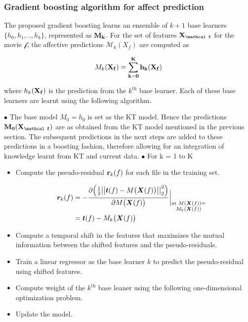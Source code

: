 \documentclass{article}
\begin{document}
\subsubsection{Gradient boosting algorithm for affect prediction}
The proposed gradient boosting learns an ensemble of $k+1$ base learners $\{h_0, h_1, .., h_k\}$, represented as $\bf M_k$. 
For the set of features $\bf X_{\mathcal f}$ for the movie $\mathcal f$, the affective predictions $\mathcal M_k(X_f)$ are computed as  

\begin{equation}
\mathcal \bf M_k(\bf X_f) = \sum_{k=0}^K h_k(\bf X_f)
\end{equation}

where $h_k(\bf X_f)$ is the prediction from the $k^\text{th}$ base learner.
Each of these base learners are learnt using the following algorithm.

$\bullet$ The base model $M_0 = h_0$ is set as the KT model. Hence the predictions $\bf M_0(\bf X_\mathcal f)$ are as obtained from the KT model mentioned in the previous section. The subsequent predictions in the next steps are added to these predictions in a boosting fashion, therefore allowing for an integration of knowledge learnt from KT and current data. 
$\bullet$ For k = 1 to K 

\begin{itemize}
\item Compute the pseudo-residual ${\bf r}_k(f)$ for each file in the training set. 	

\begin{equation} \label{pseudores}
\begin{aligned}
\hspace{-3mm}\bm r_k(f) &= - { \frac {\partial \Big({\frac{1}{2}\big|\big|\bm t(f) - M\big(\bm X(f)\big)\big|\big|^2_2}\Big)} {\partial M\big(\bm X(f)\big)} \bigg|}_{\substack{{\text{at }M(\bm X(f)) =} \\ {M_k(\bm X(f))}}}\\
&= \bm t(f) - M_k\big( \bm X(f) \big)
\end{aligned}
\end{equation}

\item Compute a temporal shift in the features that maximizes the mutual information between the shifted features and the pseudo-residuals.

\item Train a linear regressor as the base learner $k$ to predict the pseudo-residual using shifted features.

\item Compute weight of the $k^\text{th}$ base leaner using the following one-dimensional optimization problem.

\item Update the model. 

\end{itemize}
\end{document}
